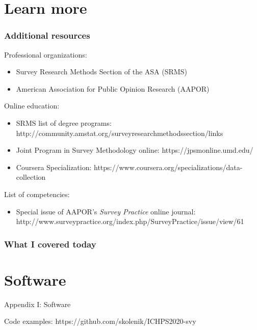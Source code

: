 \documentclass{beamer}
\begin{document}
\section{Learn more}

\begin{frame}\frametitle{Additional resources}

Professional organizations:
\begin{itemize}
    \item Survey Research Methods Section of the ASA (SRMS)
    \item American Association for Public Opinion Research (AAPOR)
\end{itemize}

Online education:
\begin{itemize}
    \item SRMS list of degree programs: http://community.amstat.org/surveyresearchmethodssection/links
    \item Joint Program in Survey Methodology online: https://jpsmonline.umd.edu/
    \item Coursera Specialization: https://www.coursera.org/specializations/data-collection
\end{itemize}

List of competencies:
\begin{itemize}
    \item Special issue of AAPOR's \textit{Survey Practice} online journal: http://www.surveypractice.org/index.php/SurveyPractice/issue/view/61
\end{itemize}

\end{frame}

\begin{frame}
    \frametitle{What I covered today}
    \tableofcontents
\end{frame}

\appendix

\section{Software}

\begin{frame}

\centering

{\Large Appendix I: Software}

\bigskip

\bigskip

Code examples: https://github.com/skolenik/ICHPS2020-svy

\end{frame}
\end{document}
